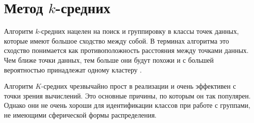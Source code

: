 \section{Метод $k$-средних}

Алгоритм $k$-средних нацелен на поиск и группировку в классы точек данных, которые имеют большое сходство между собой. В терминах алгоритма это сходство понимается как противоположность расстояния между точками данных. Чем ближе точки данных, тем больше они будут похожи и с большей вероятностью принадлежат одному кластеру \cite{bib_9}.

Алгоритм $K$-средних чрезвычайно прост в реализации и очень эффективен с точки зрения вычислений. Это основные причины, по которым он так популярен. Однако они не очень хороши для идентификации классов при работе с группами, не имеющими сферической формы распределения.








